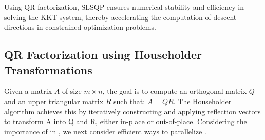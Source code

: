 
Using QR factorization, SLSQP ensures numerical stability and efficiency in solving the KKT system, thereby accelerating the computation of descent directions in constrained optimization problems.

\subsection{QR Factorization using Householder Transformations}

Given a matrix \( A \) of size \( m \times n \), the goal is to compute an orthogonal matrix \( Q \) and an upper triangular matrix \( R \) such that: $A = QR$. The Householder algorithm achieves this by iteratively constructing and applying reflection vectors to transform A into Q and R, either in-place or out-of-place. Considering the importance of \qrf in \slsqp, we next consider efficient ways to parallelize \qrf. 

